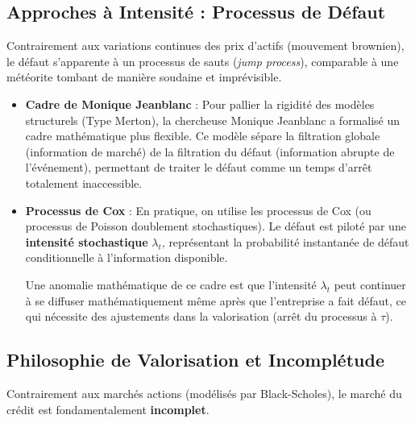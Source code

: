 \subsection{Approches à Intensité : Processus de Défaut}

Contrairement aux variations continues des prix d'actifs (mouvement brownien), le défaut s'apparente à un processus de sauts (\textit{jump process}), comparable à une météorite tombant de manière soudaine et imprévisible.

\begin{itemize}
    \item \textbf{Cadre de Monique Jeanblanc} : Pour pallier la rigidité des modèles structurels (Type Merton), la chercheuse Monique Jeanblanc a formalisé un cadre mathématique plus flexible. Ce modèle sépare la filtration globale (information de marché) de la filtration du défaut (information abrupte de l'événement), permettant de traiter le défaut comme un temps d'arrêt totalement inaccessible.
    \item \textbf{Processus de Cox} : En pratique, on utilise les processus de Cox (ou processus de Poisson doublement stochastiques). Le défaut est piloté par une \textbf{intensité stochastique} $\lambda_t$, représentant la probabilité instantanée de défaut conditionnelle à l'information disponible.
    \begin{remarque}
    Une anomalie mathématique de ce cadre est que l'intensité $\lambda_t$ peut continuer à se diffuser mathématiquement même après que l'entreprise a fait défaut, ce qui nécessite des ajustements dans la valorisation (arrêt du processus à $\tau$).
    \end{remarque}
\end{itemize}

\subsection{Philosophie de Valorisation et Incomplétude}
Contrairement aux marchés actions (modélisés par Black-Scholes), le marché du crédit est fondamentalement \textbf{incomplet}.

